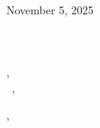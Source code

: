 \documentclass[12pt]{letter}
\begin{document}
\AddToShipoutPictureBG{%
\color{gr}
\AtPageUpperLeft{\rule[-1.3in]{\paperwidth}{1.3in}}
}

\begin{center}
{\fontsize{28}{0}\selectfont\scshape \myname}

\href{mailto:\myemail}{\faEnvelope\enspace \myemail}\hfill
\href{tel:\myphone}{\faPhone\enspace \myphone}\hfill
\faMapMarker\enspace \mylocation
\end{center}

\vspace{0.2in}

November 5, 2025\\

\vspace{-0.1in}\recipient\\
\company\\
\street\\
\city, \state\\

\vspace{-0.1in}\greeting\ \recipient,\\

\vspace{-0.1in}\setlength\parindent{24pt}
\noindent

\vspace{0.1in}
\vfill

\begin{flushright}
\closer,


\myname\\
\mytitle
\end{flushright}
\end{document}
